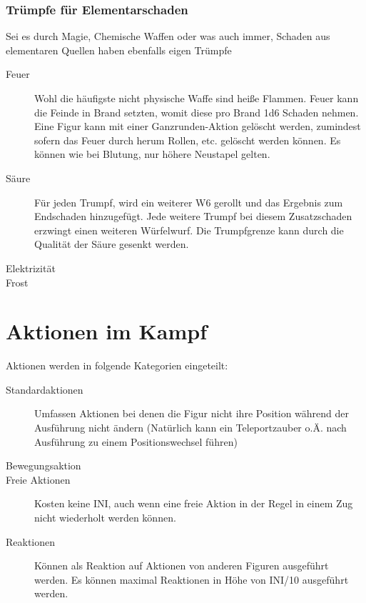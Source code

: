 \documentclass[a4paper,12pt,oneside]{book}
\begin{document}
\subsection{Trümpfe für Elementarschaden}
Sei es durch Magie, Chemische Waffen oder was auch immer, Schaden aus elementaren Quellen haben ebenfalls eigen Trümpfe
\begin{description}
\item[Feuer]Wohl die häufigste nicht physische Waffe sind heiße Flammen. Feuer kann die Feinde in Brand setzten, womit diese pro Brand 1d6 Schaden nehmen. Eine Figur kann mit einer Ganzrunden-Aktion gelöscht werden, zumindest sofern das Feuer durch herum Rollen, etc. gelöscht werden können. Es können wie bei Blutung, nur höhere Neustapel gelten.
\item[Säure]Für jeden Trumpf, wird ein weiterer W6 gerollt und das Ergebnis zum Endschaden hinzugefügt. Jede weitere Trumpf bei diesem Zusatzschaden erzwingt einen weiteren Würfelwurf. Die Trumpfgrenze kann durch die Qualität der Säure gesenkt werden.
\item[Elektrizität]
\item[Frost]
\end{description}


\chapter{Aktionen im Kampf}
Aktionen werden in folgende Kategorien eingeteilt:
\begin{description}
\item[Standardaktionen]Umfassen Aktionen bei denen die Figur nicht ihre Position während der Ausführung nicht ändern (Natürlich kann ein Teleportzauber o.Ä. nach Ausführung zu einem Positionswechsel führen)
\item[Bewegungsaktion]
\item[Freie Aktionen]Kosten keine INI, auch wenn eine freie Aktion in der Regel in einem Zug nicht wiederholt werden können.
\item[Reaktionen]Können als Reaktion auf Aktionen von anderen Figuren ausgeführt werden. Es können maximal Reaktionen in Höhe von INI/10 ausgeführt werden.
\end{description}
\end{document}
